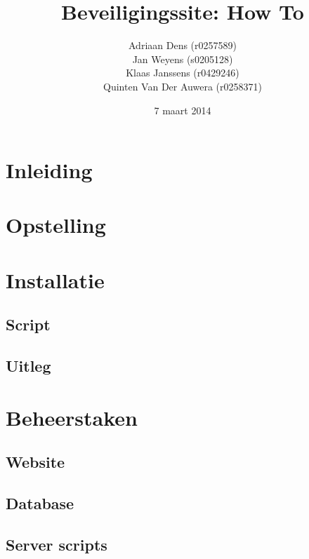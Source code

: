 \documentclass[a4paper,11pt]{report}
\begin{document}
\title{Beveiligingssite: How To}
\date{7 maart 2014}
\author{Adriaan Dens (r0257589)\\
	Jan Weyens (s0205128)\\
	Klaas Janssens (r0429246)\\
	Quinten Van Der Auwera (r0258371)
}	

\maketitle

\tableofcontents

\chapter{Inleiding}

\newpage

\chapter{Opstelling}

\newpage

\chapter{Installatie}

\section{Script}

\section{Uitleg}

\newpage

\chapter{Beheerstaken}

\section{Website}

\section{Database}

\section{Server scripts}

\end{document}
